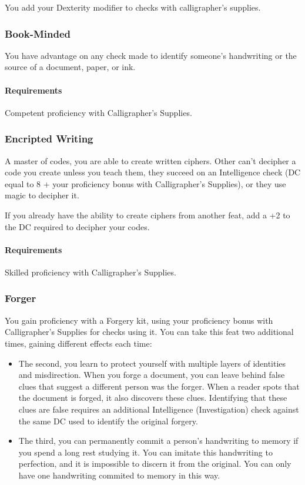     You add your Dexterity modifier to checks with calligrapher's supplies.
\subsubsection{Book-Minded} \label{feat::bookminded}
    You have advantage on any check made to identify someone's handwriting or the source of a document, paper, or ink.
    \paragraph{Requirements} Competent proficiency with Calligrapher's Supplies.
\subsubsection{Encripted Writing} \label{feat::encriptedwriting}
    A master of codes, you are able to create written ciphers.
    Other can't decipher a code you create unless you teach them, they succeed on an Intelligence check (DC equal to 8 + your proficiency bonus with Calligrapher's Supplies), or they use magic to decipher it.

    If you already have the ability to create ciphers from another feat, add a +2 to the DC required to decipher your codes.
    \paragraph{Requirements} Skilled proficiency with Calligrapher's Supplies.
\subsubsection{Forger} \label{feat::forger}
    You gain proficiency with a Forgery kit, using your proficiency bonus with Calligrapher's Supplies for checks using it.
    You can take this feat two additional times, gaining different effects each time:
    \begin{itemize}
        \item The second, you learn to protect yourself with multiple layers of identities and misdirection.
        When you forge a document, you can leave behind false clues that suggest a different person was the forger.
        When a reader spots that the document is forged, it also discovers these clues.
        Identifying that these clues are false requires an additional Intelligence (Investigation) check against the same DC used to identify the original forgery.
        \item The third, you can permanently commit a person's handwriting to memory if you spend a long rest studying it.
        You can imitate this handwriting to perfection, and it is impossible to discern it from the original.
        You can only have one handwriting commited to memory in this way.
    \end{itemize}
